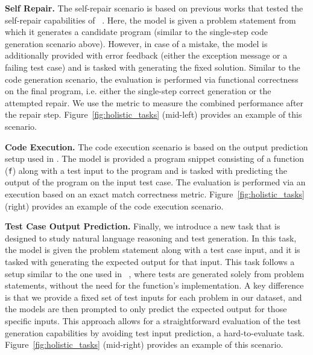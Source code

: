 \noindent \textbf{Self Repair.}
The self-repair scenario is based on previous works that tested the self-repair capabilities of \llms{}~\citep{olausson2023demystifying,shinn2023reflexion,chen2023teaching}. 
Here, the model is given a problem statement from which it generates a candidate program (similar to the single-step code generation scenario above). 
However, in case of a mistake, the model is additionally provided with error feedback (either the exception message or a failing test case) and is tasked with generating the fixed solution.
Similar to the code generation scenario, the evaluation is performed via functional correctness on the final program, i.e. either the single-step correct generation or the attempted repair.
We use the   metric to measure the combined performance after the repair step.
Figure~\ref{fig:holistic_tasks} (mid-left) provides an example of this scenario.


\noindent \textbf{Code Execution.} 
The code execution scenario is based on the output prediction setup used in \cruxeval{} \citep{gu2024cruxeval}. 
The model is provided a program snippet consisting of a function (\texttt{f}) along with a test input to the program and is tasked with predicting the output of the program on the input test case.
The evaluation is performed via an execution based on an exact match correctness metric. 
Figure~\ref{fig:holistic_tasks} (right) provides an example of the code execution scenario.

\noindent \textbf{Test Case Output Prediction.} 
Finally, we introduce a new task that is designed to study natural language reasoning and test generation. 
In this task, the model is given the problem statement along with a test case input, and it is tasked with generating the expected output for that input. 
This task follows a setup similar to the one used in \codet{}~\citep{chen2022codet}, where tests are generated solely from problem statements, without the need for the function's implementation.
A key difference is that we provide a fixed set of test inputs for each problem in our dataset, and the models are then prompted to only predict the expected output for those specific inputs. 
This approach allows for a straightforward evaluation of the test generation capabilities by avoiding test input prediction, a hard-to-evaluate task.
Figure~\ref{fig:holistic_tasks} (mid-right) provides an example of this scenario.


